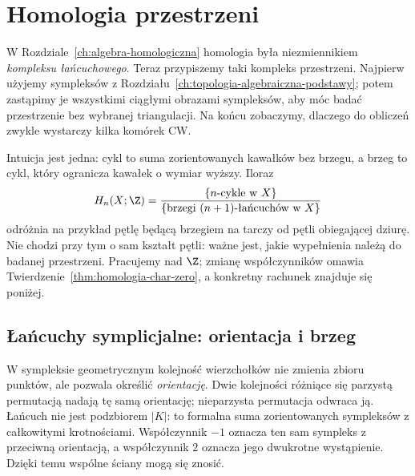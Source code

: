 \chapter{Homologia przestrzeni}
\label{ch:homologia-przestrzeni}

\providecommand{\atlasref}[2]{#2}

W Rozdziale~\ref{ch:algebra-homologiczna} homologia była
niezmiennikiem \emph{kompleksu łańcuchowego}.
Teraz przypiszemy taki kompleks przestrzeni. Najpierw
użyjemy sympleksów z Rozdziału~\ref{ch:topologia-algebraiczna-podstawy};
potem zastąpimy je wszystkimi ciągłymi obrazami sympleksów,
aby móc badać przestrzenie bez wybranej triangulacji. Na końcu
zobaczymy, dlaczego do obliczeń zwykle wystarczy
kilka komórek CW.

Intuicja jest jedna: cykl to suma zorientowanych kawałków
bez brzegu, a brzeg to cykl, który ogranicza kawałek
o wymiar wyższy. Iloraz
\[
 H_n(X;\Z)=
 \frac{\{\text{$n$-cykle w $X$}\}}
 {\{\text{brzegi $(n+1)$-łańcuchów w $X$}\}}
\]
odróżnia na przykład pętlę będącą brzegiem na tarczy od pętli
obiegającej dziurę. Nie chodzi przy tym o sam kształt pętli:
ważne jest, jakie wypełnienia należą do badanej przestrzeni.
Pracujemy nad $\Z$; zmianę
współczynników omawia
Twierdzenie~\ref{thm:homologia-char-zero},
a konkretny rachunek znajduje się poniżej.

\section{Łańcuchy symplicjalne: orientacja i brzeg}
\label{sec:homologia-symplicjalna}

W sympleksie geometrycznym kolejność wierzchołków nie zmienia
zbioru punktów, ale pozwala określić \emph{orientację}.
Dwie kolejności różniące się parzystą permutacją nadają tę samą
orientację; nieparzysta permutacja odwraca ją. Łańcuch nie jest
podzbiorem $|K|$: to formalna suma zorientowanych sympleksów
z całkowitymi krotnościami. Współczynnik $-1$ oznacza ten sam
sympleks z przeciwną orientacją, a współczynnik $2$ oznacza jego
dwukrotne wystąpienie. Dzięki temu wspólne ściany mogą się znosić.

